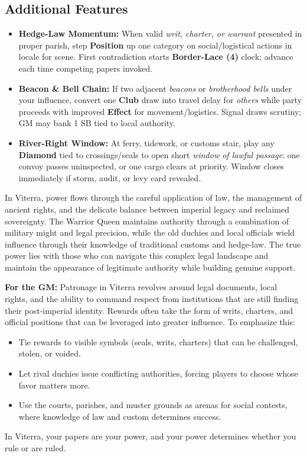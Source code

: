 \subsection*{Additional Features}
\begin{itemize}
\item \textbf{Hedge-Law Momentum:} When valid \emph{writ, charter, or warrant} presented in proper parish, step \textbf{Position} up one category on social/logistical actions in locale for scene. First contradiction starts \textbf{Border-Lace (4)} clock; advance each time competing papers invoked.
\item \textbf{Beacon \& Bell Chain:} If two adjacent \emph{beacons} or \emph{brotherhood bells} under your influence, convert one \textbf{Club} draw into travel delay for \emph{others} while party proceeds with improved \textbf{Effect} for movement/logistics. Signal draws scrutiny; GM may bank 1 SB tied to local authority.
\item \textbf{River-Right Window:} At ferry, tidework, or customs stair, play any \textbf{Diamond} tied to crossings/seals to open short \emph{window of lawful passage}: one convoy passes uninspected, or one cargo clears at priority. Window closes immediately if storm, audit, or levy card revealed.
\end{itemize}

\begin{tcolorbox}[colback=black!3,colframe=black!40!white,title={Patronage \& Power}]
In Viterra, power flows through the careful application of law, the management of ancient rights, and the delicate balance between imperial legacy and reclaimed sovereignty. The Warrior Queen maintains authority through a combination of military might and legal precision, while the old duchies and local officials wield influence through their knowledge of traditional customs and hedge-law. The true power lies with those who can navigate this complex legal landscape and maintain the appearance of legitimate authority while building genuine support.

\textbf{For the GM:}  
Patronage in Viterra revolves around legal documents, local rights, and the ability to command respect from institutions that are still finding their post-imperial identity. Rewards often take the form of writs, charters, and official positions that can be leveraged into greater influence. To emphasize this:
\begin{itemize}
\item Tie rewards to visible symbols (seals, writs, charters) that can be challenged, stolen, or voided.
\item Let rival duchies issue conflicting authorities, forcing players to choose whose favor matters more.
\item Use the courts, parishes, and muster grounds as arenas for social contests, where knowledge of law and custom determines success.
\end{itemize}
In Viterra, your papers are your power, and your power determines whether you rule or are ruled.
\end{tcolorbox}

